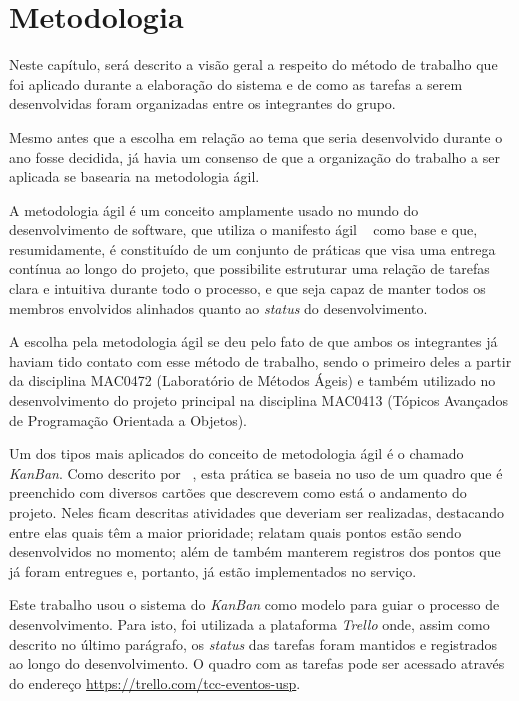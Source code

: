 \chapter{Metodologia}

Neste capítulo, será descrito a visão geral a respeito do método de trabalho
que foi aplicado durante a elaboração do sistema e de como as tarefas a serem
desenvolvidas foram organizadas entre os integrantes do grupo.

Mesmo antes que a escolha em relação ao tema que seria desenvolvido durante o
ano fosse decidida, já havia um consenso de que a organização do trabalho a ser
aplicada se basearia na metodologia ágil.

A metodologia ágil é um conceito amplamente usado no mundo do desenvolvimento
de software, que utiliza o manifesto ágil ~\citet{agileManifesto} como base e
que, resumidamente, é constituído de um conjunto de práticas que visa uma
entrega contínua ao longo do projeto, que possibilite estruturar uma relação de
tarefas clara e intuitiva durante todo o processo, e que seja capaz de manter
todos os membros envolvidos alinhados quanto ao \textit{status} do
desenvolvimento.

A escolha pela metodologia ágil se deu pelo fato de que ambos os integrantes já
haviam tido contato com esse método de trabalho, sendo o primeiro deles a
partir da disciplina MAC0472 (Laboratório de Métodos Ágeis) e também utilizado
no desenvolvimento do projeto principal na disciplina MAC0413 (Tópicos
Avançados de Programação Orientada a Objetos).

Um dos tipos mais aplicados do conceito de metodologia ágil é o chamado
\textit{KanBan}. Como descrito por ~\citet{wakode2015overview}, esta prática se
baseia no uso de um quadro que é preenchido com diversos cartões que descrevem
como está o andamento do projeto. Neles ficam descritas atividades que deveriam
ser realizadas, destacando entre elas quais têm a maior prioridade; relatam
quais pontos estão sendo desenvolvidos no momento; além de também manterem
registros dos pontos que já foram entregues e, portanto, já estão implementados
no serviço.

Este trabalho usou o sistema do \textit{KanBan} como modelo para guiar o
processo de desenvolvimento. Para isto, foi utilizada a plataforma
\textit{Trello} onde, assim como descrito no último parágrafo, os
\textit{status} das tarefas foram mantidos e registrados ao longo do
desenvolvimento. O quadro com as tarefas pode ser acessado através do endereço
\href{https://trello.com/b/kGpOiOTE/tcc-eventos-usp}{https://trello.com/tcc-eventos-usp}.

